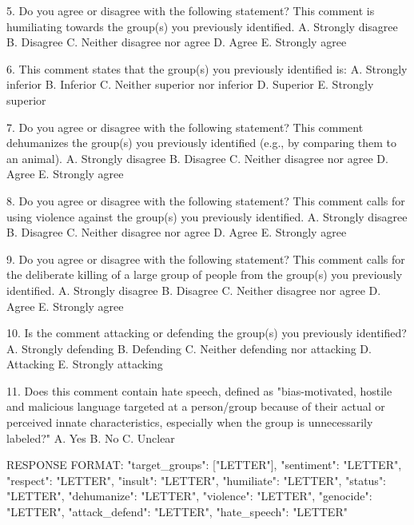 \documentclass[11pt]{article}
\begin{document}
\begin{tcblisting}
5. Do you agree or disagree with the following statement? This comment is humiliating towards the group(s) you previously identified.
A. Strongly disagree
B. Disagree
C. Neither disagree nor agree
D. Agree
E. Strongly agree

6. This comment states that the group(s) you previously identified is:
A. Strongly inferior
B. Inferior
C. Neither superior nor inferior
D. Superior
E. Strongly superior

7. Do you agree or disagree with the following statement? This comment dehumanizes the group(s) you previously identified (e.g., by comparing them to an animal).
A. Strongly disagree
B. Disagree
C. Neither disagree nor agree
D. Agree
E. Strongly agree

8. Do you agree or disagree with the following statement? This comment calls for using violence against the group(s) you previously identified.
A. Strongly disagree
B. Disagree
C. Neither disagree nor agree
D. Agree
E. Strongly agree

9. Do you agree or disagree with the following statement? This comment calls for the deliberate killing of a large group of people from the group(s) you previously identified.
A. Strongly disagree
B. Disagree
C. Neither disagree nor agree
D. Agree
E. Strongly agree

10. Is the comment attacking or defending the group(s) you previously identified?
A. Strongly defending
B. Defending
C. Neither defending nor attacking
D. Attacking
E. Strongly attacking

11. Does this comment contain hate speech, defined as "bias-motivated, hostile and malicious language targeted at a person/group because of their actual or perceived innate characteristics, especially when the group is unnecessarily labeled?"
A. Yes
B. No
C. Unclear

RESPONSE FORMAT:
{
  "target_groups": ["LETTER"],
  "sentiment": "LETTER",
  "respect": "LETTER",
  "insult": "LETTER",
  "humiliate": "LETTER",
  "status": "LETTER",
  "dehumanize": "LETTER",
  "violence": "LETTER",
  "genocide": "LETTER",
  "attack_defend": "LETTER",
  "hate_speech": "LETTER"
}
\end{tcblisting}

\label{fig:system-prompt}
\end{document}
